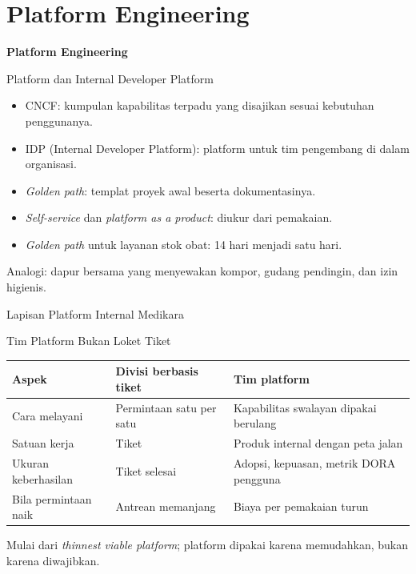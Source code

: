 \documentclass[aspectratio=169, table, 12pt]{beamer}
\begin{document}
\section{Platform Engineering}

\begin{frame}{\hfill}
  \centering
  \Huge{\textbf{Platform Engineering}}
\end{frame}

\begin{frame}{{\Large Platform dan Internal Developer Platform}}
  \vspace{10pt}
  \begin{itemize}
    \item CNCF: kumpulan kapabilitas terpadu yang disajikan sesuai kebutuhan penggunanya.
    \item IDP (Internal Developer Platform): platform untuk tim pengembang di dalam organisasi.
    \item \textit{Golden path}: templat proyek awal beserta dokumentasinya.
    \item \textit{Self-service} dan \textit{platform as a product}: diukur dari pemakaian.
    \item \textit{Golden path} untuk layanan stok obat: 14 hari menjadi satu hari.
  \end{itemize}
  \vspace{6pt}
  {\small Analogi: dapur bersama yang menyewakan kompor, gudang pendingin, dan izin higienis.}
\end{frame}

\begin{frame}{{\Large Lapisan Platform Internal Medikara}}
  \centering
\end{frame}

\begin{frame}{{\Large Tim Platform Bukan Loket Tiket}}
  \footnotesize
  \begin{tabularx}{\textwidth}{>{\raggedright\arraybackslash}p{3.4cm}
      >{\raggedright\arraybackslash}X >{\raggedright\arraybackslash}X}
    \hline
    \textbf{Aspek} & \textbf{Divisi berbasis tiket} & \textbf{Tim platform} \\
    \hline
    Cara melayani & Permintaan satu per satu & Kapabilitas swalayan dipakai berulang \\
    \hline
    Satuan kerja & Tiket & Produk internal dengan peta jalan \\
    \hline
    Ukuran keberhasilan & Tiket selesai & Adopsi, kepuasan, metrik DORA pengguna \\
    \hline
    Bila permintaan naik & Antrean memanjang & Biaya per pemakaian turun \\
    \hline
  \end{tabularx}

  \vspace{8pt}
  \small Mulai dari \textit{thinnest viable platform}; platform dipakai karena memudahkan, bukan
  karena diwajibkan.
\end{frame}
\end{document}
